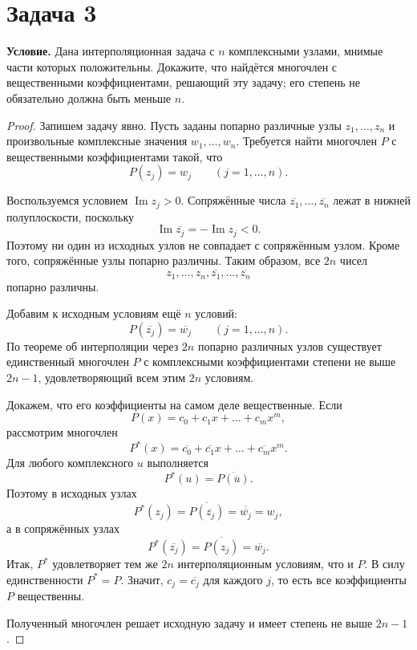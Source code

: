 \documentclass[12pt]{article}
\begin{document}
	\section*{Задача 3}

	\noindent
	\textbf{Условие.} Дана интерполяционная задача с $n$ комплексными
	узлами, мнимые части которых положительны. Докажите, что найдётся
	многочлен с вещественными коэффициентами, решающий эту задачу; его
	степень не обязательно должна быть меньше $n$.

	\begin{proof}
		Запишем задачу явно. Пусть заданы попарно различные узлы
		$z_1,\ldots,z_n$ и произвольные комплексные значения
		$w_1,\ldots,w_n$. Требуется найти многочлен $P$ с вещественными
		коэффициентами такой, что
		\[
			P(z_j)=w_j\qquad(j=1,\ldots,n).
		\]

		Воспользуемся условием $\operatorname{Im}z_j>0$. Сопряжённые числа
		$\overline{z_1},\ldots,\overline{z_n}$ лежат в нижней полуплоскости,
		поскольку
		\[
			\operatorname{Im}\overline{z_j}
				=-\operatorname{Im}z_j<0.
		\]
		Поэтому ни один из исходных узлов не совпадает с сопряжённым
		узлом. Кроме того, сопряжённые узлы попарно различны. Таким образом,
		все $2n$ чисел
		\[
			z_1,\ldots,z_n,\overline{z_1},\ldots,\overline{z_n}
		\]
		попарно различны.

		Добавим к исходным условиям ещё $n$ условий:
		\[
			P(\overline{z_j})=\overline{w_j}
			\qquad(j=1,\ldots,n).
		\]
		По теореме об интерполяции через $2n$ попарно различных узлов
		существует единственный многочлен $P$ с комплексными
		коэффициентами степени не выше $2n-1$, удовлетворяющий всем
		этим $2n$ условиям.

		Докажем, что его коэффициенты на самом деле вещественные.
		Если
		\[
			P(x)=c_0+c_1x+\dots+c_mx^m,
		\]
		рассмотрим многочлен
		\[
			P^*(x)=\overline{c_0}
				+\overline{c_1}x+\dots+\overline{c_m}x^m.
		\]
		Для любого комплексного $u$ выполняется
		\[
			P^*(u)=\overline{P(\overline{u})}.
		\]
		Поэтому в исходных узлах
		\[
			P^*(z_j)
				=\overline{P(\overline{z_j})}
				=\overline{\overline{w_j}}
				=w_j,
		\]
		а в сопряжённых узлах
		\[
			P^*(\overline{z_j})
				=\overline{P(z_j)}
				=\overline{w_j}.
		\]
		Итак, $P^*$ удовлетворяет тем же $2n$ интерполяционным
		условиям, что и $P$. В силу единственности $P^*=P$. Значит,
		$c_j=\overline{c_j}$ для каждого $j$, то есть все коэффициенты
		$P$ вещественны.

		Полученный многочлен решает исходную задачу и имеет степень
		не выше $2n-1$.
	\end{proof}
\end{document}
